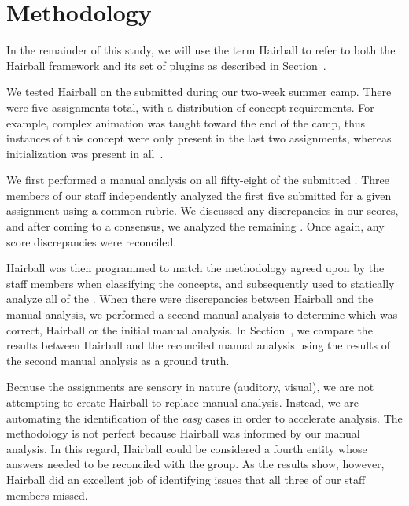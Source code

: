 \section{Methodology} 
In the remainder of this study, we will use the term Hairball to refer to both
the Hairball framework and its set of plugins as described in
Section~.

We tested Hairball on the  submitted during our two-week summer
camp.  There were five assignments total, with a distribution of concept
requirements. For example, complex animation was taught toward the end of the
camp, thus instances of this concept were only present in the last two
assignments, whereas initialization was present in
all~\cite{Franklin:2013:SBO}.

We first performed a manual analysis on all fifty-eight of the submitted
.  Three members of our staff independently analyzed the first five
 submitted for a given assignment using a common rubric. We
discussed any discrepancies in our scores, and after coming to a consensus, we
analyzed the remaining . Once again, any score discrepancies were
reconciled.

Hairball was then programmed to match the methodology agreed upon by the staff
members when classifying the concepts, and subsequently used to statically
analyze all of the .  When there were discrepancies between
Hairball and the manual analysis, we performed a second manual analysis to
determine which was correct, Hairball or the initial manual analysis. In
Section~, we compare the results between Hairball and the
reconciled manual analysis using the results of the second manual analysis as a
ground truth.

Because the assignments are sensory in nature (auditory, visual), we are not
attempting to create Hairball to replace manual analysis.  Instead, we are
automating the identification of the \emph{easy} cases in order to accelerate
analysis.  The methodology is not perfect because Hairball was informed by our
manual analysis. In this regard, Hairball could be considered a fourth entity
whose answers needed to be reconciled with the group.  As the results show,
however, Hairball did an excellent job of identifying issues that all three of
our staff members missed.
